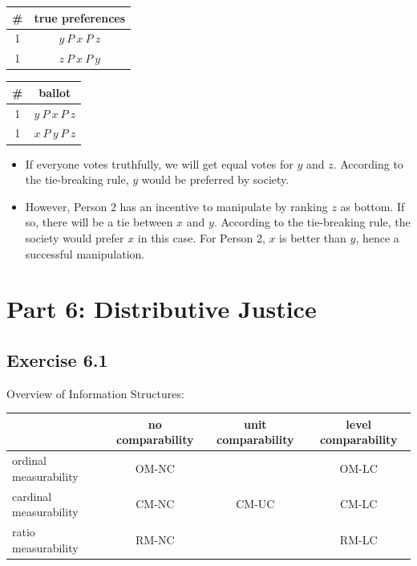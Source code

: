 \documentclass[a4paper]{article}
\begin{document}
\begin{table}[!htbp]
    \centering
    \begin{tabular}{c|c|}
        \# & true preferences         \\ 
        \hline
        1  & $y\: P\: x\: P\: z$ \\
        1  & $z\: P\: x\: P\: y$ \\
        \hline
    \end{tabular}
\end{table}

\begin{table}[!htbp]
    \centering
    \begin{tabular}{c|c|}
        \# & ballot              \\ 
        \hline
        1  & $y\: P\: x\: P\: z$ \\
        1  & $x\: P\: y\: P\: z$ \\
        \hline
    \end{tabular}
\end{table}

\begin{itemize}
    \item If everyone votes truthfully, we will get equal votes for $y$ and $z$. According to the tie-breaking rule, $y$ would be preferred by society. 
    \item However, Person 2 has an incentive to manipulate by ranking $z$ as bottom. If so, there will be a tie between $x$ and $y$. According to the tie-breaking rule, the society would prefer $x$ in this case. For Person 2, $x$ is better than $y$, hence a successful manipulation.
\end{itemize}

\section*{Part 6: Distributive Justice}

\subsection*{Exercise 6.1}

Overview of Information Structures:
\begin{table}[!htbp]
    \centering
    \begin{tabular}{l|c|c|c|}
                               & no comparability & unit comparability & level comparability \\ 
        \hline
        ordinal measurability  & OM-NC            &                    & OM-LC               \\
        \hline
        cardinal measurability & CM-NC            & CM-UC              & CM-LC               \\
        \hline
        ratio measurability    & RM-NC            &                    & RM-LC               \\
        \hline
    \end{tabular}
\end{table}
\end{document}
